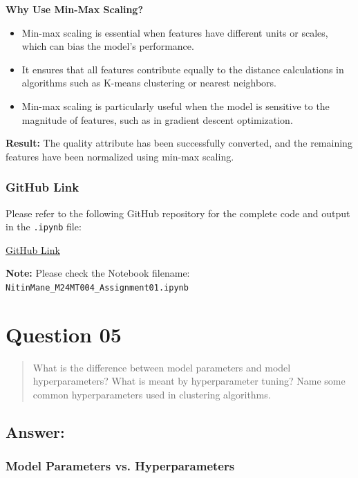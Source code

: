 \documentclass{exam}
\begin{document}
\textbf{Why Use Min-Max Scaling?}
\begin{itemize}
    \item Min-max scaling is essential when features have different units or scales, which can bias the model's performance.
    \item It ensures that all features contribute equally to the distance calculations in algorithms such as K-means clustering or nearest neighbors.
    \item Min-max scaling is particularly useful when the model is sensitive to the magnitude of features, such as in gradient descent optimization.
\end{itemize}

\textbf{Result:} The quality attribute has been successfully converted, and the remaining features have been normalized using min-max scaling.

\subsubsection{GitHub Link}

Please refer to the following GitHub repository for the complete code and output in the \texttt{.ipynb} file:

\href{https://github.com/Nitin-Mane/CS550-Machine-Learning-Assignment/tree/main/Assignment_03}{GitHub Link}

\textbf{Note:} Please check the Notebook filename: \texttt{NitinMane\_M24MT004\_Assignment01.ipynb}

\section{Question 05}

\begin{quote}
What is the difference between model parameters and model hyperparameters? What is meant by hyperparameter tuning? Name some common hyperparameters used in clustering algorithms.
\end{quote}

\subsection{Answer:}

\subsubsection{Model Parameters vs. Hyperparameters}
\end{document}
